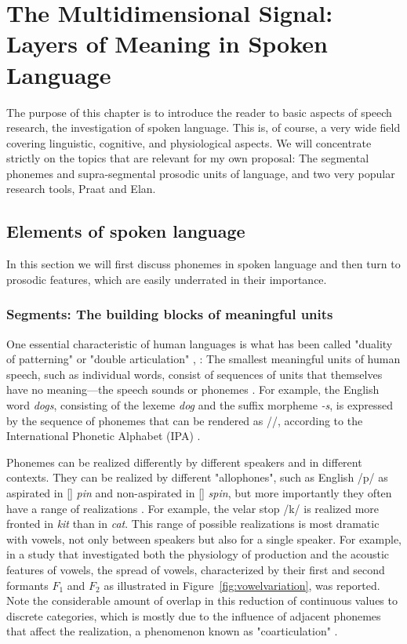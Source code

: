 \chapter{The Multidimensional Signal: Layers of Meaning in Spoken Language}
\label{StateOfArt}

The purpose of this chapter is to introduce the reader to basic aspects of speech research, the investigation of spoken language. This is, of course, a very wide field covering linguistic, cognitive, and physiological aspects. We will concentrate strictly on the topics that are relevant for my own proposal: The segmental phonemes and supra-segmental prosodic units of language, and two very popular research tools, Praat and Elan. 

\section{Elements of spoken language}

In this section we will first discuss phonemes in spoken language and then turn to prosodic features, which are easily underrated in their importance. 

\subsection{Segments: The building blocks of meaningful units}

One essential characteristic of human languages is what has been called "duality of patterning" or "double articulation" \cite{hockett1958course}, \cite{martinet1960elements}: The smallest meaningful units of human speech, such as individual words, consist of sequences of units that themselves have no meaning—the speech sounds or phonemes \cite{hockett1958course}. For example, the English word \textit{dogs}, consisting of the lexeme \textit{dog} and the suffix morpheme \textit{-s}, is expressed by the sequence of phonemes that can be rendered as //, according to the International Phonetic Alphabet (IPA) \cite{internationalphoneticassociation1999ipa}. 

Phonemes can be realized differently by different speakers and in different contexts. They can be realized by different "allophones", such as English /p/ as aspirated in [] \textit{pin} and non-aspirated in [] \textit{spin}, but more importantly they often have a range of realizations \cite{internationalphoneticassociation1999ipa}. For example, the velar stop /k/ is realized more fronted in \textit{kit} than in \textit{cat}. This range of possible realizations is most dramatic with vowels, not only between speakers but also for a single speaker. For example, in a study that investigated both the physiology of production and the acoustic features of vowels, the spread of vowels, characterized by their first and second formants $F_1$ and $F_2$ as illustrated in Figure~\ref{fig:vowelvariation}, was reported. Note the considerable amount of overlap in this reduction of continuous values to discrete categories, which is mostly due to the influence of adjacent phonemes that affect the realization, a phenomenon known as "coarticulation" .

